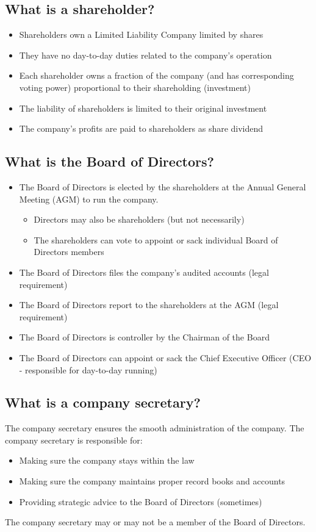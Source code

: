 \subsection{What is a shareholder?}
\begin{itemize}
    \item Shareholders own a Limited Liability Company limited by shares
    \item They have no day-to-day duties related to the company's operation
    \item Each shareholder owns a fraction of the company (and has corresponding voting power) proportional to their shareholding (investment)
    \item The liability of shareholders is limited to their original investment
    \item The company's profits are paid to shareholders as share dividend
\end{itemize}
\subsection{What is the Board of Directors?}
\begin{itemize}
    \item The Board of Directors is elected by the shareholders at the Annual General Meeting (AGM) to run the company.
          \begin{itemize}
              \item Directors may also be shareholders (but not necessarily)
              \item The shareholders can vote to appoint or sack individual Board of Directors members
          \end{itemize}
    \item The Board of Directors files the company's audited accounts (legal requirement)
    \item The Board of Directors report to the shareholders at the AGM (legal requirement)
    \item The Board of Directors is controller by the Chairman of the Board
    \item The Board of Directors can appoint or sack the Chief Executive Officer (CEO - responsible for day-to-day running)
\end{itemize}
\subsection{What is a company secretary?}
The company secretary ensures the smooth administration of the company. The company secretary is responsible for:
\begin{itemize}
    \item Making sure the company stays within the law
    \item Making sure the company maintains proper record books and accounts
    \item Providing strategic advice to the Board of Directors (sometimes)
\end{itemize}
The company secretary may or may not be a member of the Board of Directors.
